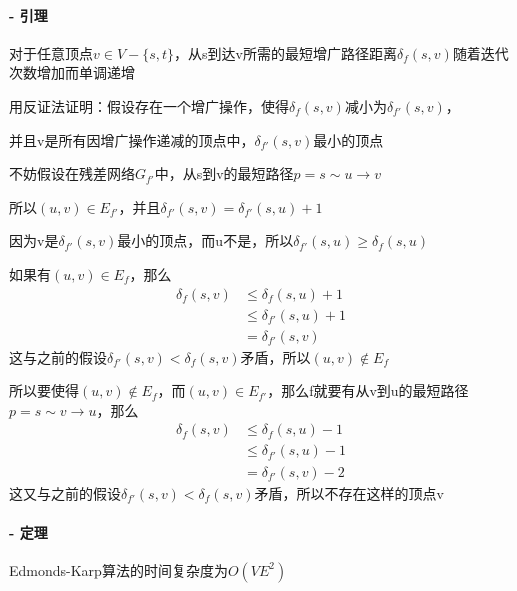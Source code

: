 \documentclass[UTF8]{ctexart}
\begin{document}
\begin{enumerate}
            \vspace{1.2cm}


            \paragraph{- 引理}
            对于任意顶点$v\in V-\{s,t\}$，从s到达v所需的最短增广路径距离$\delta_f(s,v)$随着迭代次数增加而单调递增

            用反证法证明：假设存在一个增广操作，使得$\delta_f(s,v)$减小为$\delta_{f'}(s,v)$，

            并且v是所有因增广操作递减的顶点中，$\delta_{f'}(s,v)$最小的顶点

            不妨假设在残差网络$G_{f'}$中，从s到v的最短路径$p=s\sim u\to v$

            所以$(u,v)\in E_{f'}$，并且$\delta_{f'}(s,v)=\delta_{f'}(s,u)+1$

            因为v是$\delta_{f'}(s,v)$最小的顶点，而u不是，所以$\delta_{f'}(s,u)\ge\delta_f(s,u)$

            如果有$(u,v)\in E_f$，那么
            $$
                  \begin{aligned}
                        \delta_f(s,v) & \le\delta_f(s,u)+1    \\
                                      & \le\delta_{f'}(s,u)+1 \\
                                      & =\delta_{f'}(s,v)
                  \end{aligned}
            $$
            这与之前的假设$\delta_{f'}(s,v)<\delta_f(s,v)$矛盾，所以$(u,v)\notin E_f$

            所以要使得$(u,v)\notin E_f$，而$(u,v)\in E_{f'}$，那么f就要有从v到u的最短路径$p=s\sim v\to u$，那么
            $$
                  \begin{aligned}
                        \delta_f(s,v) & \le\delta_f(s,u)-1    \\
                                      & \le\delta_{f'}(s,u)-1 \\
                                      & =\delta_{f'}(s,v)-2
                  \end{aligned}
            $$
            这又与之前的假设$\delta_{f'}(s,v)<\delta_f(s,v)$矛盾，所以不存在这样的顶点v

            \vspace{1cm}

            \paragraph{- 定理}
            Edmonds-Karp算法的时间复杂度为$O(VE^2)$


\end{enumerate}
\end{document}
